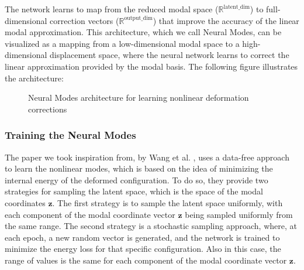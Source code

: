 The network learns to map from the reduced modal space (\( \mathbb{R}^{\text{latent\_dim}} \)) to full-dimensional correction vectors (\( \mathbb{R}^{\text{output\_dim}} \)) that improve the accuracy of the linear modal approximation. This architecture, which we call Neural Modes, can be visualized as a mapping from a low-dimensional modal space to a high-dimensional displacement space, where the neural network learns to correct the linear approximation provided by the modal basis. The following figure illustrates the architecture:
\begin{figure}[H]    \centering
    \caption{Neural Modes architecture for learning nonlinear deformation corrections}
    \label{fig:neural_modes_arch}
\end{figure}



\subsubsection{Training the Neural Modes} %
\label{sec:training_neural_modes}
The paper we took inspiration from, by Wang et al. \cite{Wang_Du_Coros_Thomaszewski_2024}, uses a data-free approach to learn the nonlinear modes, which is based on the idea of minimizing the internal energy of the deformed configuration. To do so, they provide two strategies for sampling the latent space, which is the space of the modal coordinates \( \bm{z} \). The first strategy is to sample the latent space uniformly, with each component of the modal coordinate vector \( \bm{z} \) being sampled uniformly from the same range. The second strategy is a stochastic sampling approach, where, at each epoch, a new random vector is generated, and the network is trained to minimize the energy loss for that specific configuration. Also in this case, the range of values is the same for each component of the modal coordinate vector \( \bm{z} \).

